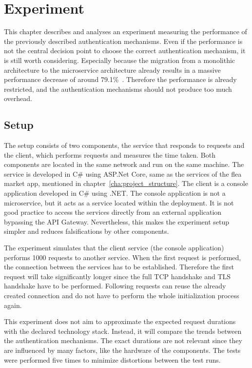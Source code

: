 \chapter{Experiment}
\label{cha:experiment}
This chapter describes and analyses an experiment measuring the performance of the previously described authentication mechanisms.
Even if the performance is not the central decision point to choose the correct authentication mechanism, it is still worth considering.
Especially because the migration from a monolithic architecture to the microservice architecture already results in a massive performance decrease of around 79.1\%~\cite{ueda2016workload}.
Therefore the performance is already restricted, and the authentication mechanisms should not produce too much overhead.

\section{Setup}
The setup consists of two components, the service that responds to requests and the client, which performs requests and measures the time taken.
Both components are located in the same network and run on the same machine.
The service is developed in C\# using ASP.Net Core, same as the services of the flea market app, mentioned in chapter~\ref{cha:project_structure}.
The client is a console application developed in C\# using .NET.
The console application is not a microservice, but it acts as a service located within the deployment.
It is not good practice to access the services directly from an external application bypassing the API Gateway.
Nevertheless, this makes the experiment setup simpler and reduces falsifications by other components. 

The experiment simulates that the client service (the console application) performs 1000 requests to another service.
When the first request is performed, the connection between the services has to be established.
Therefore the first request will take significantly longer since the full TCP handshake and TLS handshake have to be performed.
Following requests can reuse the already created connection and do not have to perform the whole initialization process again.

This experiment does not aim to approximate the expected request durations with the declared technology stack.
Instead, it will compare the trends between the authentication mechanisms.
The exact durations are not relevant since they are influenced by many factors, like the hardware of the components.
The tests were performed five times to minimize distortions between the test runs.

